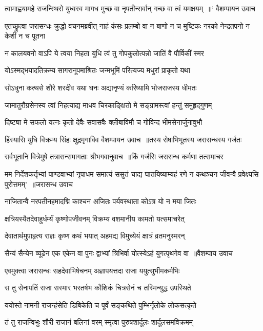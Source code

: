\twolineshloka
{त्वामाह्वयामहे राजन्स्थिरो युध्वस्व मागध}
{मुच्छ वा नृपतीन्सर्वान् गच्छ वा त्वं यमक्षयम् ॥` वैशम्पायन उवाच}


एतच्छ्रुत्वा जरासन्धः क्रुद्धो वचनमब्रवीत्
\twolineshloka
{नाहं कंसः प्रलम्बो वा न बाणो न च मुष्टिकः}
{नरको नेन्द्रतपनो न केशी न च पूतना}


\twolineshloka
{न कालयवनो वाऽपि ये त्वया निहता युधि}
{त्वं तु गोपकुलोत्पन्नो जातिं वै पौर्विकीं स्मर}


\twolineshloka
{योऽस्मद्भयादतिक्रम्य सागरानूपमाश्रितः}
{जन्मभूमिं परित्यज्य मधुरां प्राकृतो यथा}


\twolineshloka
{सोऽधुना कत्थसे शौरे शरदीव यथा घनः}
{अद्यानृण्यं करिष्यामि भोजराजस्य धीमतः}


\twolineshloka
{जामातुरौग्रसेनस्य त्वां निहत्याद्य माधव}
{चिरकाङ्क्षितो मे सङ्ग्रामस्त्वां हन्तुं समुहृद्गुणम्}


\twolineshloka
{दिष्ट्या मे सफलो यत्नः कृतो देवैः सवासवैः}
{क्लीबाविमौ च गोविन्द भीमसेनार्जुनावुभौ}


\twolineshloka
{हिंस्यासि युधि विक्रम्य सिंहः क्षुद्रमृगाविव}
{वैशम्पायन उवाच ॥तस्य रोषाभिभूतस्य जरासन्धस्य गर्जतः}


\twolineshloka
{सर्वभूतानि वित्रेमुषे तत्रासन्समागताः}
{श्रीभगवानुवाच ॥किं गर्जसि जरासन्ध कर्मणा तत्समाचर}


\fourlineindentedshloka
{मम निर्देशकर्तृभ्यां पाण्डवाभ्यां नृपाधम}
{समात्यं ससुतं चाद्य घातयिष्याम्यहं रणे}
{न कथञ्चन जीवन्वै प्रवेक्ष्यसि पुरोत्तमम्' ॥जरासन्ध उवाच}
{}


\twolineshloka
{नाजितान्वै नरपतीनहमादद्मि काश्चन}
{अजितः पर्यवस्थाता कोऽत्र यो न मया जितः}


\twolineshloka
{क्षत्रियस्यैतदेवाहुर्धर्म्यं कृष्णोपजीवनम्}
{विक्रम्य वशमानीय कामतो यत्समाचरेत्}


\twolineshloka
{देवातार्थमुपाहृत्य राज्ञः कृष्ण कथं भयात्}
{अहमद्य विमुच्येयं क्षात्रं व्रतमनुस्मरन्}


\threelineshloka
{सैन्यं सैन्येन व्यूढेन एक एकेन वा पुनः}
{द्वाभ्यां त्रिभिर्वा योत्स्येऽहं युगत्पृथगेव वा ॥वैशम्पाय उवाच}
{}


\twolineshloka
{एवमुक्त्वा जरासन्धः सहदेवाभिषेचनम्}
{अज्ञापयत्तदा राजा ययुत्सुर्भीमकर्मभिः}


\twolineshloka
{स तु सेनापतिं राजा सस्मार भरतर्षभ}
{कौशिकं चित्रसेनं च तस्मिन्युद्ध उपस्थिते}


\twolineshloka
{ययोस्ते नामनी राजन्हंसेति डिबिकेति च}
{पूर्वं सङ्कथिते पुम्भिर्नृलोके लोकसत्कृते}


\twolineshloka
{तं तु राजन्विभुः शौरी राजानं बलिनां वरम्}
{स्मृत्वा पुरुषशार्दूलः शार्दूलसमविक्रमम्}



